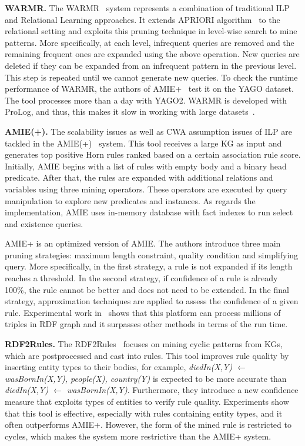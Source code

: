 \textbf{WARMR.} The WARMR~\cite{ref16, ref17} system represents a combination of traditional ILP and Relational Learning approaches. It extends APRIORI algorithm~\cite{ref44} to the relational setting and exploits this pruning technique in level-wise search to mine patterns. More specifically, at each level, infrequent queries are removed and the remaining frequent ones are expanded using the above operation. New queries are deleted if they can be expanded from an infrequent pattern in the previous level. This step is repeated until we cannot generate new queries. To check the runtime performance of WARMR, the authors of AMIE+~\cite{ref10} test it on the YAGO dataset. The tool processes more than a day with YAGO2. WARMR is developed with ProLog, and thus, this makes it slow in working with large datasets~\cite{ref10}.

\textbf{AMIE(+).} The scalability issues as well as CWA assumption issues of ILP are tackled in the AMIE(+)~\cite{ref10} system. This tool receives a large KG as input and generates top positive Horn rules ranked based on a certain association rule score. Initially, AMIE begins with a list of rules with empty body and a binary head predicate. After that, the rules are expanded with additional relations and variables using three mining operators. These operators are executed by query manipulation to explore new predicates and instances. As regards the implementation, AMIE uses in-memory database with fact indexes to run select and existence queries.

AMIE+ is an optimized version of AMIE. The authors introduce three main pruning strategies: maximum length constraint, quality condition and simplifying query. More specifically, in the first strategy, a rule is not expanded if its length reaches a threshold. In the second strategy, if confidence of a rule is already 100\%, the rule cannot be better and does not need to be extended. In the final strategy, approximation techniques are applied to assess the confidence of a given rule. Experimental work in~\cite{ref10} shows that this platform can process millions of triples in RDF graph and it surpasses other methods in terms of the run time.

\textbf{RDF2Rules.} The RDF2Rules~\cite{ref29} focuses on mining cyclic patterns from KGs, which are postprocessed and cast into rules. This tool improves rule quality by inserting entity types to their bodies, for example, \textit{diedIn(X,Y) $\leftarrow$ wasBornIn(X,Y), people(X), country(Y)} is expected to be more accurate than \textit{diedIn(X,Y) $\leftarrow$ wasBornIn(X,Y)}. Furthermore, they introduce a new confidence measure that exploits types of entities to verify rule quality. Experiments show that this tool is effective, especially with rules containing entity types, and it often outperforms AMIE+. However, the form of the mined rule is restricted to cycles, which makes the system more restrictive than the AMIE+ system.

